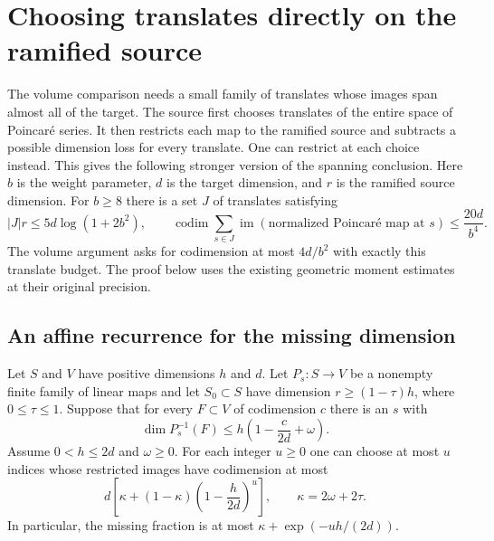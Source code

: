 \section{Choosing translates directly on the ramified source}
\label{sec:affine-spanning}

The volume comparison needs a small family of translates whose images span
almost all of the target. The source first chooses translates of the entire
space of Poincar\'e series. It then restricts each map to the ramified
source and subtracts a possible dimension loss for every translate. One
can restrict at each choice instead. This gives the following stronger
version of the spanning conclusion. Here $b$ is the weight parameter,
$d$ is the target dimension, and $r$ is the ramified source dimension.
For $b\ge 8$ there is a set $J$ of translates satisfying
\begin{equation}
 |J|r\le 5d\log(1+2b^2),\qquad
 \operatorname{codim}\sum_{s\in J}
  \operatorname{im}(\text{normalized Poincar\'e map at }s)
 \le \frac{20d}{b^4}.
 \label{eq:affine-spanning-bound}
\end{equation}
The volume argument asks for codimension at most $4d/b^2$ with exactly
this translate budget. The proof below uses the existing geometric moment
estimates at their original precision.

\subsection*{An affine recurrence for the missing dimension}

Let $S$ and $V$ have positive dimensions $h$ and $d$. Let $P_s:S\to V$
be a nonempty finite family of linear maps and let $S_0\subset S$ have
dimension $r\ge (1-\tau)h$, where $0\le\tau\le1$. Suppose that for
every $F\subset V$ of codimension $c$ there is an $s$ with
\begin{equation}
 \dim P_s^{-1}(F)\le h\left(1-\frac{c}{2d}+\omega\right).
 \label{eq:affine-spread}
\end{equation}
Assume $0<h\le 2d$ and $\omega\ge0$. For each integer $u\ge 0$
one can choose at most $u$ indices whose restricted images have
codimension at most
\begin{equation}
  d\left[\kappa+(1-\kappa)\left(1-\frac{h}{2d}\right)^u\right],
  \qquad \kappa=2\omega+2\tau.
  \label{eq:affine-spread-recurrence}
\end{equation}
In particular, the missing fraction is at most
$\kappa+\exp(-uh/(2d))$.


